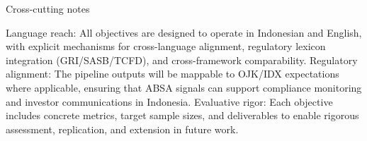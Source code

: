 
Cross-cutting notes

Language reach: All objectives are designed to operate in Indonesian and English, with explicit mechanisms for cross-language alignment, regulatory lexicon integration (GRI/SASB/TCFD), and cross-framework comparability.
Regulatory alignment: The pipeline outputs will be mappable to OJK/IDX expectations where applicable, ensuring that ABSA signals can support compliance monitoring and investor communications in Indonesia.
Evaluative rigor: Each objective includes concrete metrics, target sample sizes, and deliverables to enable rigorous assessment, replication, and extension in future work.